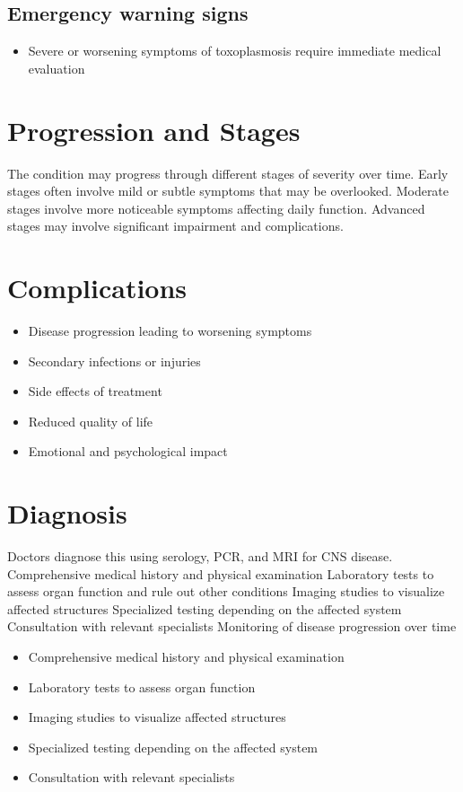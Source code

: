\subsection{Emergency warning signs}
\begin{itemize}[noitemsep]
  \item Severe or worsening symptoms of toxoplasmosis require immediate medical evaluation
\end{itemize}
\section{Progression and Stages}
The condition may progress through different stages of severity over time. Early stages often involve mild or subtle symptoms that may be overlooked. Moderate stages involve more noticeable symptoms affecting daily function. Advanced stages may involve significant impairment and complications.
\section{Complications}
\begin{itemize}[noitemsep]
  \item Disease progression leading to worsening symptoms
  \item Secondary infections or injuries
  \item Side effects of treatment
  \item Reduced quality of life
  \item Emotional and psychological impact
\end{itemize}
\section{Diagnosis}
Doctors diagnose this using serology, PCR, and MRI for CNS disease. Comprehensive medical history and physical examination Laboratory tests to assess organ function and rule out other conditions Imaging studies to visualize affected structures Specialized testing depending on the affected system Consultation with relevant specialists Monitoring of disease progression over time

\begin{itemize}[noitemsep]
  \item Comprehensive medical history and physical examination
  \item Laboratory tests to assess organ function
  \item Imaging studies to visualize affected structures
  \item Specialized testing depending on the affected system
  \item Consultation with relevant specialists
\end{itemize}
